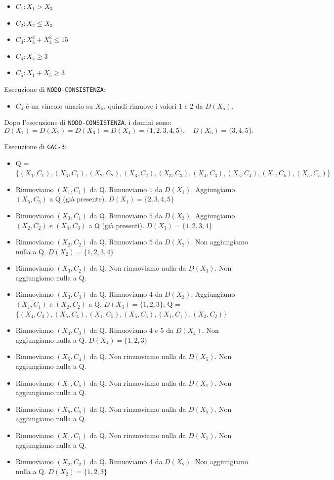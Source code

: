 \documentclass[a4paper,11pt]{article}
\begin{document}
\begin{itemize}
  \item $C_1: X_1 > X_3$
  \item $C_2: X_2 \leq X_3$
  \item $C_3: X_3^2 + X_4^2 \leq 15$
  \item $C_4: X_5 \geq 3$
  \item $C_5: X_1 + X_5 \geq 3$
\end{itemize}

Esecuzione di \texttt{NODO-CONSISTENZA}:

\begin{itemize}
  \item $C_4$ è un vincolo unario su $X_5$, quindi rimuove i valori $1$ e $2$ da $D(X_5)$.
\end{itemize}

Dopo l'esecuzione di \texttt{NODO-CONSISTENZA}, i domini sono:
\[
D(X_1) = D(X_2) = D(X_3) = D
(X_4) = \{1, 2, 3, 4, 5\}, \quad D(X_5) = \{3, 4, 5\}.
\]

Esecuzione di \texttt{GAC-3}:

\begin{itemize}
  \item Q = $\{(X_1, C_1), (X_3, C_1), (X_2, C_2), (X_3, C_2), (X_3, C_3), (X_4, C_3), (X_5, C_4), (X_1, C_5), (X_5, C_5)\}$
  \item Rimuoviamo $(X_1, C_1)$ da Q. Rimuoviamo $1$ da $D(X_1)$. Aggiungiamo $(X_5, C_5)$ a Q (già presente).
  \subitem $D(X_1) = \{2, 3, 4, 5\}$
  \item Rimuoviamo $(X_3, C_1)$ da Q. Rimuoviamo $5$ da $D(X_3)$. Aggiungiamo $(X_2, C_2)$ e $(X_4, C_3)$ a Q (già presenti).
  \subitem $D(X_3) = \{1, 2, 3, 4\}$
  \item Rimuoviamo $(X_2, C_2)$ da Q. Rimuoviamo $5$ da $D(X_2)$. Non aggiungiamo nulla a Q.
  \subitem $D(X_2) = \{1, 2, 3, 4\}$
  \item Rimuoviamo $(X_3, C_2)$ da Q. Non rimuoviamo nulla da $D(X_3)$. Non aggiungiamo nulla a Q.
  \item Rimuoviamo $(X_3, C_3)$ da Q. Rimuoviamo $4$ da $D(X_3)$. Aggiungiamo $(X_1, C_1)$ e $(X_2, C_2)$ a Q.
  \subitem $D(X_3) = \{1, 2, 3\}$, Q = $\{(X_4, C_3), (X_5, C_4), (X_1, C_5), (X_5, C_5), (X_1, C_1), (X_2, C_2)\}$
  \item Rimuoviamo $(X_4, C_3)$ da Q. Rimuoviamo $4$ e $5$ da $D(X_4)$. Non aggiungiamo nulla a Q.
  \subitem $D(X_4) = \{1, 2, 3\}$
  \item Rimuoviamo $(X_5, C_4)$ da Q. Non rimuoviamo nulla da $D(X_5)$. Non aggiungiamo nulla a Q.
  \item Rimuoviamo $(X_1, C_5)$ da Q. Non rimuoviamo nulla da $D(X_1)$. Non aggiungiamo nulla a Q.
  \item Rimuoviamo $(X_5, C_5)$ da Q. Non rimuoviamo nulla da $D(X_5)$. Non aggiungiamo nulla a Q.
  \item Rimuoviamo $(X_1, C_1)$ da Q. Non rimuoviamo nulla da $D(X_1)$. Non aggiungiamo nulla a Q.
  \item Rimuoviamo $(X_2, C_2)$ da Q. Rimuoviamo $4$ da $D(X_2)$. Non aggiungiamo nulla a Q.
  \subitem $D(X_2) = \{1, 2, 3\}$
\end{itemize}
\end{document}
